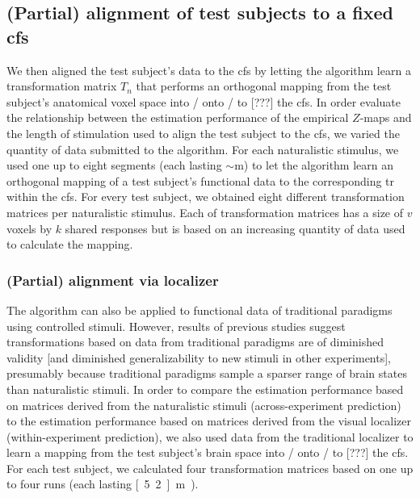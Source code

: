 \subsection{(Partial) alignment of test subjects to a fixed \ac{cfs}}




We then aligned the test subject's data to the \ac{cfs} by letting the algorithm
learn a transformation matrix $T_{n}$ that performs an orthogonal mapping from
the test subject's anatomical voxel space into / onto / to [???] the \ac{cfs}.
In order evaluate the relationship between the estimation performance of the
empirical $Z$-maps and the length of stimulation used to align the test subject
to the \ac{cfs}, we varied the quantity of data submitted to the algorithm.
%
For each naturalistic stimulus, we used one up to eight segments (each lasting
$\sim$\unit[15]{m}) to let the algorithm learn an orthogonal mapping of a test
subject's functional data to the corresponding \acs{tr} within the \ac{cfs}.
%
For every test subject, we obtained eight different transformation matrices per
naturalistic stimulus.
%
Each of transformation matrices has a size of $v$ voxels by $k$ shared responses
but is based on an increasing quantity of data used to calculate the mapping.


\subsubsection{(Partial) alignment via localizer}

The algorithm can also be applied to functional data of traditional paradigms
using controlled stimuli.
%
However, results of previous studies \citep{guntupalli2016model,
haxby2011common} suggest transformations based on data from traditional
paradigms are of diminished validity [and diminished generalizability to new
stimuli in other experiments], presumably because traditional paradigms sample a
sparser range of brain states than naturalistic stimuli.
%
In order to compare the estimation performance based on matrices derived from
the naturalistic stimuli (across-experiment prediction) to the estimation
performance based on matrices derived from the visual localizer
(within-experiment prediction), we also used data from the traditional localizer
to learn a mapping from the test subject's brain space into / onto / to [???]
the \ac{cfs}.
%
For each test subject, we calculated four transformation matrices based on one
up to four runs (each lasting \unit[5.2]{m}).



